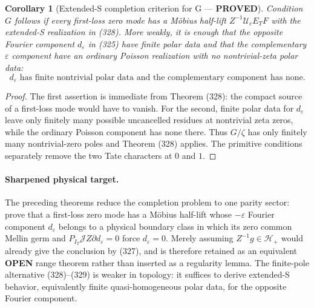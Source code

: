 \documentclass[11pt]{article}
\newtheorem{corollary}[theorem]{Corollary}
\newcommand{\PROVED}{\textcolor{green!45!black}{\textbf{PROVED}}}
\newcommand{\OPEN}{\textcolor{red!70!black}{\textbf{OPEN}}}
\begin{document}
\begin{corollary}[Extended-S completion criterion for G --- \PROVED]
Condition $G$ follows if every first-loss zero mode has a M\"obius half-lift
$Z^{-1}\mathcal U_cE_TF$ with the extended-S realization in (328).  More
weakly, it is enough that the opposite Fourier component
$d_\varepsilon$ in (325) have finite polar data and that the complementary
$\varepsilon$ component have an ordinary Poisson realization with no
nontrivial-zeta polar data:
\begin{equation}
 \boxed{\text{$d_\varepsilon$ has finite nontrivial polar data and
 the complementary component has none.}}              \tag{329}
\end{equation}
\end{corollary}

\begin{proof}
The first assertion is immediate from Theorem (328): the compact source of a
first-loss mode would have to vanish.  For the second, finite polar data for
$d_\varepsilon$ leave only finitely many possible uncancelled residues at
nontrivial zeta zeros, while the ordinary Poisson component has none there.
Thus $G/\zeta$ has only finitely many nontrivial-zero poles and Theorem (328)
applies.  The primitive conditions separately remove the two Tate characters
at $0$ and $1$.
\end{proof}

\paragraph{Sharpened physical target.}
The preceding theorems reduce the completion problem to one parity sector:
prove that a first-loss zero mode has a M\"obius half-lift whose
$-\varepsilon$ Fourier component $d_{\varepsilon}$ belongs to a physical
boundary class in which its zero common Mellin germ and
$P_{I_T}\mathscr JZ\partial d_{\varepsilon}=0$ force
$d_{\varepsilon}=0$.  Merely assuming $Z^{-1}g\in\mathcal H_+$ would already
give the conclusion by (327), and is therefore retained as an equivalent
\OPEN{} range theorem rather than inserted as a regularity lemma.  The
finite-pole alternative (328)--(329) is weaker in topology: it suffices to
derive extended-S behavior, equivalently finite quasi-homogeneous polar data,
for the opposite Fourier component.
\end{document}
